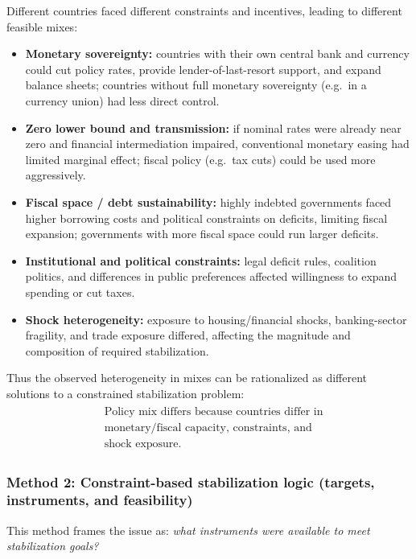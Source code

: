 \documentclass[12pt]{article}
\begin{document}
\begin{enumerate}[label=(\alph*)]
Different countries faced different constraints and incentives, leading to different feasible mixes:
\begin{itemize}[leftmargin=*]
  \item \textbf{Monetary sovereignty:} countries with their own central bank and currency could cut policy rates, provide lender-of-last-resort support, and expand balance sheets; countries without full monetary sovereignty (e.g.\ in a currency union) had less direct control.
  \item \textbf{Zero lower bound and transmission:} if nominal rates were already near zero and financial intermediation impaired, conventional monetary easing had limited marginal effect; fiscal policy (e.g.\ tax cuts) could be used more aggressively.
  \item \textbf{Fiscal space / debt sustainability:} highly indebted governments faced higher borrowing costs and political constraints on deficits, limiting fiscal expansion; governments with more fiscal space could run larger deficits.
  \item \textbf{Institutional and political constraints:} legal deficit rules, coalition politics, and differences in public preferences affected willingness to expand spending or cut taxes.
  \item \textbf{Shock heterogeneity:} exposure to housing/financial shocks, banking-sector fragility, and trade exposure differed, affecting the magnitude and composition of required stabilization.
\end{itemize}
Thus the observed heterogeneity in mixes can be rationalized as different solutions to a constrained stabilization problem:
\begin{align*}
\boxed{
  \begin{aligned}
    &\text{Policy mix differs because countries differ in} \\&\text{monetary/fiscal capacity, constraints, and} \\
    &\text{shock exposure.}
  \end{aligned}
}
\end{align*}
\end{enumerate}

\subsubsection*{Method 2: Constraint-based stabilization logic (targets, instruments, and feasibility)}
This method frames the issue as: \emph{what instruments were available to meet stabilization goals?}
\end{document}
